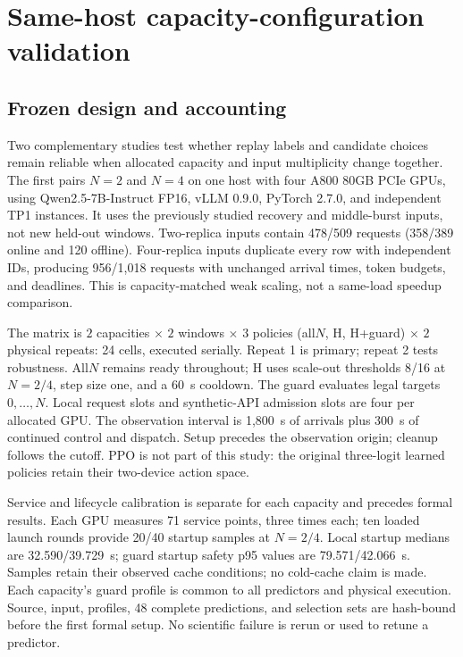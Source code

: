 \section{Same-host capacity-configuration validation}
\label{sec:capacity-validation}

\subsection{Frozen design and accounting}
Two complementary studies test whether replay labels and candidate choices remain reliable
when allocated capacity and input multiplicity change together. The first pairs
$N=2$ and $N=4$ on one host with four A800 80GB PCIe GPUs, using
Qwen2.5-7B-Instruct FP16, vLLM 0.9.0, PyTorch 2.7.0, and independent TP1
instances. It uses the previously studied recovery and middle-burst inputs,
not new held-out windows. Two-replica inputs contain 478/509 requests
(358/389 online and 120 offline). Four-replica inputs duplicate every row
with independent IDs, producing 956/1,018 requests with unchanged arrival
times, token budgets, and deadlines. This is capacity-matched weak scaling,
not a same-load speedup comparison.

The matrix is $2$ capacities $\times$ $2$ windows $\times$
$3$ policies (all$N$, H, H+guard) $\times$ $2$ physical repeats: 24 cells,
executed serially. Repeat 1 is primary; repeat 2 tests robustness.
All$N$ remains ready throughout; H uses scale-out thresholds 8/16 at
$N=2/4$, step size one, and a 60~s cooldown. The guard evaluates legal
targets $0,\ldots,N$. Local request slots and synthetic-API admission slots
are four per allocated GPU. The observation interval is 1,800~s of arrivals
plus 300~s of continued control and dispatch. Setup precedes the observation
origin; cleanup follows the cutoff. PPO is not part of this study: the
original three-logit learned policies retain their two-device action space.

Service and lifecycle calibration is separate for each capacity and precedes
formal results. Each GPU measures 71 service points, three times each;
ten loaded launch rounds provide 20/40 startup samples at $N=2/4$.
Local startup medians are 32.590/39.729~s; guard startup safety p95 values
are 79.571/42.066~s. Samples retain their observed cache conditions; no
cold-cache claim is made. Each capacity's guard profile is common to all
predictors and physical execution. Source, input, profiles, 48 complete
predictions, and selection sets are hash-bound before the first formal
setup. No scientific failure is rerun or used to retune a predictor.

